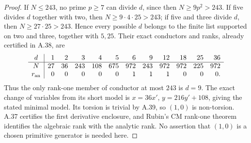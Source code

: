 \begin{proof}
If $N\leq243$, no prime $p\geq7$ can divide $d$, since then
$N\geq9p^2>243$. If five divides $d$ together with two, then
$N\geq9\cdot4\cdot25>243$; if five and three divide $d$, then
$N\geq27\cdot25>243$. Hence every possible $d$ belongs to the finite
list supported on two and three, together with $5,25$. Their exact
conductors and ranks, already certified in A.38, are
\[
\begin{array}{c|rrrrrrrrrrr}
d&1&2&3&4&5&6&9&12&18&25&36\\\hline
N&27&36&243&108&675&972&243&972&972&225&972\\
r_{\rm an}&0&0&0&0&0&1&1&1&0&0&0.
\end{array}
\]
Thus the only rank-one member of conductor at most $243$ is $d=9$.
The exact change of variables from its short model is
$x=36x'$, $y=216y'+108$, giving the stated minimal model. Its torsion
is trivial by A.39, so $(1,0)$ is non-torsion. A.37 certifies the first
derivative enclosure, and Rubin's CM rank-one theorem identifies the
algebraic rank with the analytic rank. No assertion that $(1,0)$ is a
chosen primitive generator is needed here.
\end{proof}
